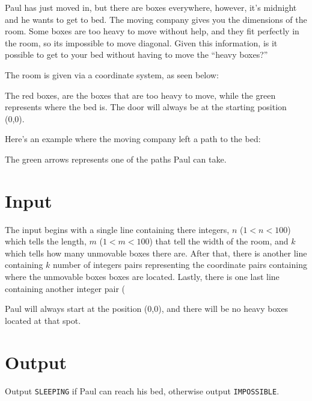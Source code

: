 


Paul has just moved in, but there are boxes everywhere, however,
it's midnight and he wants to get to bed. The moving company
gives you the dimensions of the room. Some boxes are too heavy to
move without help, and they fit perfectly in the room, so its impossible to move diagonal. Given this
information, is it possible to get to your bed without having to
move the ``heavy boxes?''

The room is given via a coordinate system, as seen below:

The red boxes, are the boxes that are too heavy to move, while the green represents where the bed is. The door will always be at the starting position (0,0).

Here's an example where the moving company left a path to the bed:

The green arrows represents one of the paths Paul can take.


\section*{Input}

The input begins with a single line containing there integers, $n$ ($1 < n < 100$) which tells the length, $m$ ($1 < m < 100$) that tell the width of the room, and $k$ which tells how many unmovable boxes there are. 
After that, there is another line containing $k$ number of integers pairs representing the coordinate pairs containing where the unmovable boxes 
boxes are located. Lastly, there is one last line containing another integer pair (%

Paul will always start at the position (0,0), and there will be no heavy boxes located at that spot.

\section*{Output}

Output \texttt{SLEEPING} if Paul can reach his bed, otherwise output \texttt{IMPOSSIBLE}.

